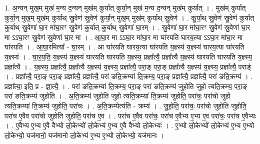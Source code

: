 \documentclass[17pt]{extarticle}
\begin{document}
1. अ॒न्यन् मुख॒म् मुख॑ म॒न्य द॒न्यन् मुख॑म् कुर्यात् कुर्या॒न् मुख॑ म॒न्य द॒न्यन् मुख॑म् कुर्यात् । . मुख॑म् कुर्यात् कुर्या॒न् मुख॒म् मुख॑म् कुर्याथ् स्रु॒वेण॑ स्रु॒वेण॑ कुर्या॒न् मुख॒म् मुख॑म् कुर्याथ् स्रु॒वेण॑ । . कु॒र्या॒थ् स्रु॒वेण॑ स्रु॒वेण॑ कुर्यात् कुर्याथ् स्रु॒वेणा॑ घा॒र मा॑घा॒रꣳ स्रु॒वेण॑ कुर्यात् कुर्याथ् स्रु॒वेणा॑ घा॒रम् । . स्रु॒वेणा॑ घा॒र मा॑घा॒रꣳ स्रु॒वेण॑ स्रु॒वेणा॑ घा॒र मा ऽऽघा॒रꣳ स्रु॒वेण॑ स्रु॒वेणा॑ घा॒र मा । . आ॒घा॒र मा ऽऽघा॒र मा॑घा॒र मा घा॑रयति घारय॒त्या ऽऽघा॒र मा॑घा॒र मा घा॑रयति । . आ॒घा॒रमित्या᳚ - घा॒रम् । . आ घा॑रयति घारय॒त्या घा॑रयति य॒ज्ञ्स्य॑ य॒ज्ञ्स्य॑ घारय॒त्या घा॑रयति य॒ज्ञ्स्य॑ । . घा॒र॒य॒ति॒ य॒ज्ञ्स्य॑ य॒ज्ञ्स्य॑ घारयति घारयति य॒ज्ञ्स्य॒ प्रज्ञा᳚त्यै॒ प्रज्ञा᳚त्यै य॒ज्ञ्स्य॑ घारयति घारयति य॒ज्ञ्स्य॒ प्रज्ञा᳚त्यै । . य॒ज्ञ्स्य॒ प्रज्ञा᳚त्यै॒ प्रज्ञा᳚त्यै य॒ज्ञ्स्य॑ य॒ज्ञ्स्य॒ प्रज्ञा᳚त्यै॒ परा॒ङ् परा॒ङ् प्रज्ञा᳚त्यै य॒ज्ञ्स्य॑ य॒ज्ञ्स्य॒ प्रज्ञा᳚त्यै॒ पराङ्॑ । . प्रज्ञा᳚त्यै॒ परा॒ङ् परा॒ङ् प्रज्ञा᳚त्यै॒ प्रज्ञा᳚त्यै॒ परा॑ ङति॒क्रम्या॑ ति॒क्रम्य॒ परा॒ङ् प्रज्ञा᳚त्यै॒ प्रज्ञा᳚त्यै॒ परा॑ ङति॒क्रम्य॑ । . प्रज्ञा᳚त्या॒ इति॒ प्र - ज्ञा॒त्यै॒ । . परा॑ ङति॒क्रम्या॑ ति॒क्रम्य॒ परा॒ङ् परा॑ ङति॒क्रम्य॑ जुहोति जुहो त्यति॒क्रम्य॒ परा॒ङ् परा॑ ङति॒क्रम्य॑ जुहोति । . अ॒ति॒क्रम्य॑ जुहोति जुहो त्यति॒क्रम्या॑ ति॒क्रम्य॑ जुहोति॒ परा॑चः॒ परा॑चो जुहो त्यति॒क्रम्या॑ ति॒क्रम्य॑ जुहोति॒ परा॑चः । . अ॒ति॒क्रम्येत्य॑ति - क्रम्य॑ । . जु॒हो॒ति॒ परा॑चः॒ परा॑चो जुहोति जुहोति॒ परा॑च ए॒वैव परा॑चो जुहोति जुहोति॒ परा॑च ए॒व । . परा॑च ए॒वैव परा॑चः॒ परा॑च ए॒वैभ्य ए॒भ्य ए॒व परा॑चः॒ परा॑च ए॒वैभ्यः । . ए॒वैभ्य ए॒भ्य ए॒वै वैभ्यो लो॒केभ्यो॑ लो॒केभ्य॑ ए॒भ्य ए॒वै वैभ्यो लो॒केभ्यः॑ । . ए॒भ्यो लो॒केभ्यो॑ लो॒केभ्य॑ ए॒भ्य ए॒भ्यो लो॒केभ्यो॒ यज॑मानो॒ यज॑मानो लो॒केभ्य॑ ए॒भ्य ए॒भ्यो लो॒केभ्यो॒ यज॑मानः । \newline
\end{document}
